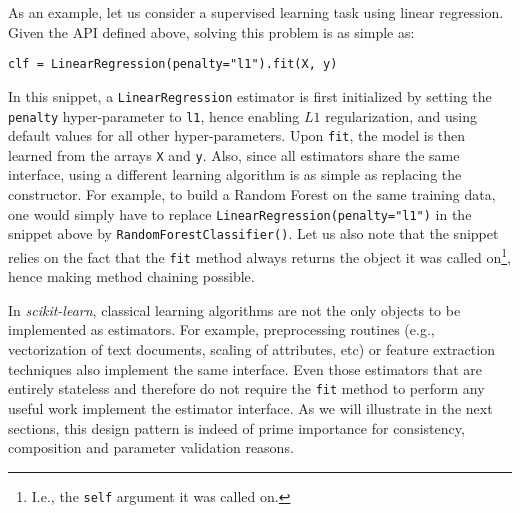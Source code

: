 \documentclass{llncs}
\begin{document}

As an example, let us consider a supervised learning task using linear regression.
Given the API defined above, solving this problem is as simple as:
\begin{center}
\texttt{clf = LinearRegression(penalty="l1").fit(X, y)}
\end{center}
In this snippet, a \texttt{LinearRegression} estimator is first initialized by
setting the \texttt{penalty} hyper-parameter to \texttt{l1}, hence enabling $L1$
regularization, and using default values for all other hyper-parameters. Upon
\texttt{fit}, the model is then learned from the arrays \texttt{X} and
\texttt{y}. Also, since all estimators share the same interface, using a
different learning algorithm is as simple as replacing the constructor. For
example, to build a Random Forest on the same training data, one would simply
have to replace \texttt{LinearRegression(penalty="l1")} in the snippet above by
\texttt{RandomForestClassifier()}. Let us also note that the snippet relies on the
fact that the \texttt{fit} method always returns the object it was called
on\footnote{I.e., the \texttt{self} argument it was called on.}, hence making
method chaining  possible.

In \textit{scikit-learn}, classical learning algorithms are not the only objects
to be implemented as estimators. For example, preprocessing routines (e.g.,
vectorization of text documents, scaling of attributes, etc) or feature
extraction techniques also implement the same interface. Even those estimators
that are entirely stateless and therefore do not require the \texttt{fit} method
to perform any useful work implement the estimator interface. As we will
illustrate in the next sections, this design pattern is indeed of prime
importance for consistency, composition and parameter validation reasons.
\end{document}
